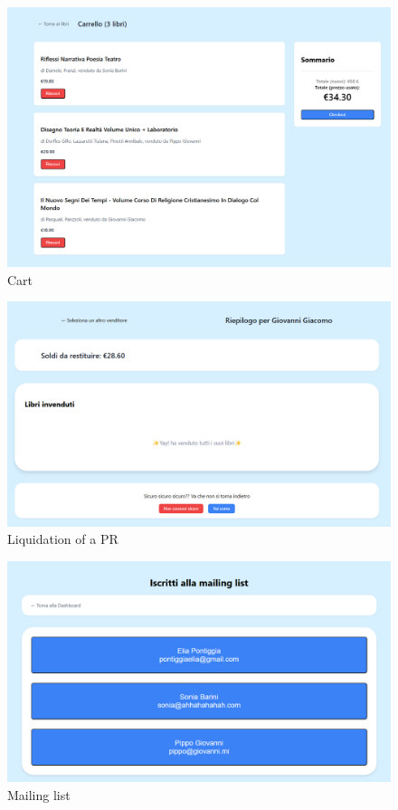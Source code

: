 \begin{figure}[ht]
    \centering
    \includegraphics[width=.75\textwidth]{assets/ui_mockup/cart.png}
    \caption{Cart}
    \label{fig:cart}
\end{figure}

\begin{figure}[ht]
    \centering
    \includegraphics[width=.75\textwidth]{assets/ui_mockup/liquidation.png}
    \caption{Liquidation of a PR}
    \label{fig:liquidation}
\end{figure}

\begin{figure}[ht]
    \centering
    \includegraphics[width=.75\textwidth]{assets/ui_mockup/mailinglist.png}
    \caption{Mailing list}
    \label{fig:mailinglist}
\end{figure}

